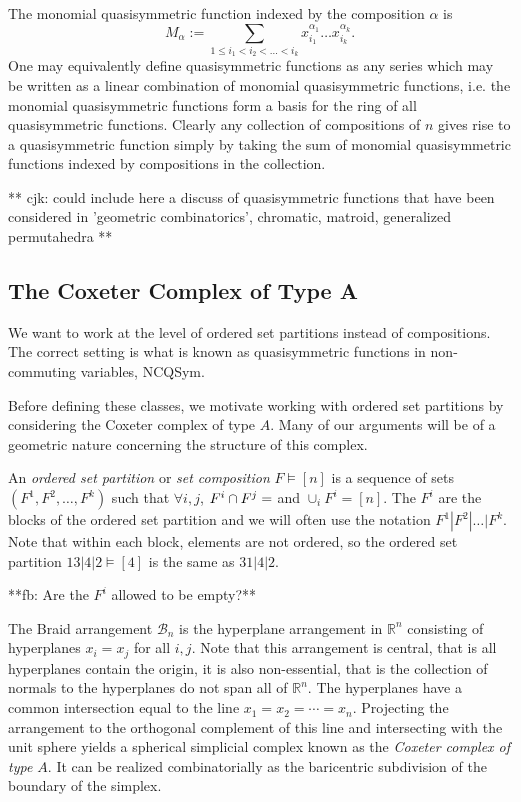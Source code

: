 \documentclass[12pt]{amsart}
\begin{document}
The monomial quasisymmetric function indexed by the composition $\alpha$ is 
$$M_{\alpha} := \sum_{1 \leq i_1 < i_2 < \ldots < i_k}
x_{i_1}^{\alpha_1} \ldots x_{i_k}^{\alpha_k}.$$  One may equivalently
define quasisymmetric functions as any series which may be written as a
linear combination of monomial quasisymmetric functions, i.e. the
monomial quasisymmetric functions form a basis for the ring of all
quasisymmetric functions.  Clearly any collection of
compositions of $n$ gives rise to a quasisymmetric function simply by
taking the sum of monomial quasisymmetric functions indexed by
compositions in the collection.

** cjk: could include here a discuss of quasisymmetric functions that have
been considered in 'geometric combinatorics', chromatic, matroid,
generalized permutahedra **

\subsection{The Coxeter Complex of Type A}
We want to work at the level of ordered set partitions instead of
compositions.  The correct setting is what is known as 
quasisymmetric functions in non-commuting variables, NCQSym.

Before defining these classes, we motivate working with ordered set
partitions by considering the Coxeter complex of type $A$.  Many of
our arguments will be of a geometric nature concerning the structure
of this complex.


An \emph{ordered set partition} or \emph{set composition} $F \vDash
[n]$ is a sequence of sets $(F^1,F^2, \ldots, F^k)$ such that $\forall
i,j$, $ F^i \cap F^j = \empty$ and $\cup_i F^i = [n]$.  The $F^i$ are the
blocks of the ordered set partition and we will often use the notation
$F^1 | F^2 | \ldots | F^k$.  Note that within each block, elements are
not ordered, so the ordered set partition $13|4|2 \vDash [4]$ is the
same as $31|4|2$.

**fb: Are the $F^i$ allowed to be empty?**


The Braid arrangement $\mathcal{B}_n$ is the hyperplane arrangement in
$\mathbb{R}^n$ consisting of hyperplanes $x_i = x_j$ for all $i,j$.
Note that this arrangement is central, that is all hyperplanes contain
the origin, it is also non-essential, that is the collection of
normals to the hyperplanes do not span all of $\mathbb{R}^n$.  The
hyperplanes have a common intersection equal to the line $x_1 = x_2 = \cdots
= x_n$.  Projecting the arrangement to the orthogonal complement of
this line and intersecting with the unit sphere yields a spherical
simplicial complex known as the \emph{Coxeter complex of type $A$}.
It can be realized combinatorially as the baricentric subdivision of the
boundary of the simplex. 
\end{document}
